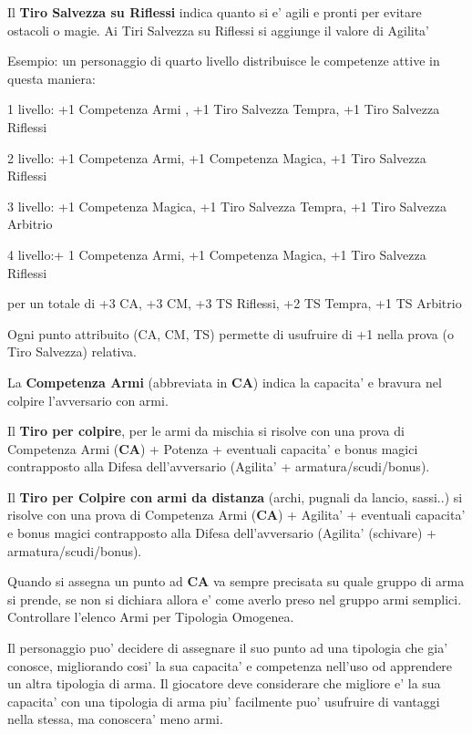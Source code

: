 \documentclass[a4paper,11pt,twoside,openany]{book}
\begin{document}
	Il \textbf{Tiro Salvezza su Riflessi} indica quanto si e' agili e pronti per evitare ostacoli o magie. Ai Tiri Salvezza su Riflessi si aggiunge il valore di Agilita'
	
	\bigskip
	
	Esempio: un personaggio di quarto livello distribuisce le competenze
	attive in questa maniera:
	
	1 livello: +1 Competenza Armi , +1 Tiro Salvezza Tempra, +1 Tiro Salvezza Riflessi
	
	2 livello: +1 Competenza Armi, +1 Competenza Magica, +1 Tiro Salvezza Riflessi
	
	3 livello: +1 Competenza Magica, +1 Tiro Salvezza Tempra, +1 Tiro Salvezza Arbitrio
	
	4 livello:+ 1 Competenza Armi, +1 Competenza Magica, +1 Tiro Salvezza Riflessi
	
	per un totale di +3 CA, +3 CM, +3 TS Riflessi, +2 TS Tempra, +1 TS Arbitrio
	
	\bigskip
	
	Ogni punto attribuito (CA, CM, TS) permette di usufruire di +1 nella prova (o Tiro Salvezza) relativa.
	
	La \textbf{Competenza Armi} (abbreviata in \textbf{CA}) indica la capacita' e bravura nel colpire l'avversario con armi.
	
	Il \textbf{Tiro per colpire}, per le armi da mischia si risolve con una prova di Competenza Armi (\textbf{CA}) + Potenza + eventuali capacita' e bonus magici contrapposto alla Difesa dell'avversario (Agilita' + armatura/scudi/bonus).
	
	Il \textbf{Tiro per Colpire con armi da distanza} (archi, pugnali da lancio, sassi..) si risolve con una prova di Competenza Armi (\textbf{CA}) + Agilita' + eventuali capacita' e bonus magici contrapposto alla Difesa dell'avversario (Agilita' (schivare) + armatura/scudi/bonus).
	
	Quando si assegna un punto ad \textbf{CA} va sempre precisata su quale gruppo di arma si prende, se non si dichiara allora e' come averlo preso nel gruppo armi semplici.
	Controllare l'elenco Armi per Tipologia Omogenea.
	
	Il personaggio puo' decidere di assegnare il suo punto ad una tipologia che gia' conosce, migliorando cosi' la sua capacita' e competenza nell'uso od apprendere un altra tipologia di arma. 
	Il giocatore deve considerare che migliore e' la sua capacita' con una tipologia di arma piu' facilmente puo' usufruire di vantaggi nella stessa, ma conoscera' meno armi.
	
\end{document}
